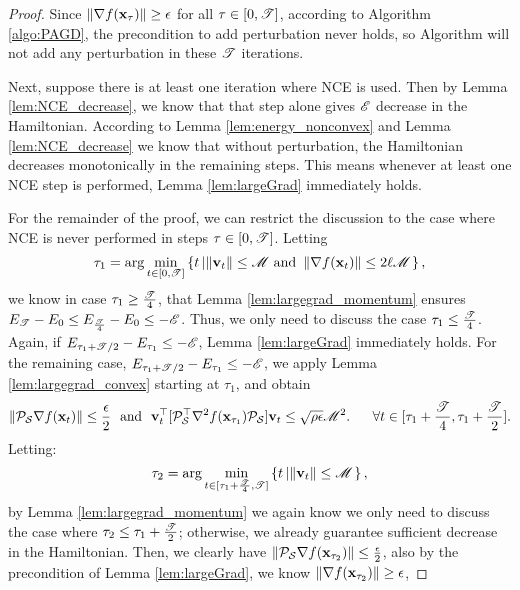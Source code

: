 \begin{proof}
Since $\left\|{\nabla f(\mathbf{x}_\tau)}\right\| \ge \epsilon$ for all $ \tau \in [0, \mathscr{T}]$, according to Algorithm \ref{algo:PAGD}, the precondition to add perturbation never holds, so Algorithm will not add any perturbation in these $\mathscr{T}$ iterations.

Next, suppose there is at least one iteration where NCE is used. Then by Lemma \ref{lem:NCE_decrease}, we know that that step alone gives $\mathscr{E}$ decrease in the Hamiltonian. According to Lemma \ref{lem:energy_nonconvex} and Lemma \ref{lem:NCE_decrease} we know that without perturbation, the Hamiltonian decreases monotonically in the remaining steps. This means whenever at least one NCE step is performed, Lemma \ref{lem:largeGrad} immediately holds.

For the remainder of the proof, we can restrict the discussion to the case where NCE is never performed in steps $\tau \in [0, \mathscr{T}]$.
Letting
\begin{equation*}
\tau_1 = \arg\min_{t \in [0, \mathscr{T}]}\left\{t \left| \left\|{\mathbf{v}_t}\right\|\le \mathscr{M}
\text{~and~} \left\|{\nabla f(\mathbf{x}_t)}\right\| \le 2\ell\mathscr{M} \right.\right\},
\end{equation*}
we know in case $\tau_1 \ge \frac{\mathscr{T}}{4}$, that Lemma \ref{lem:largegrad_momentum} 
ensures 
$E_{\mathscr{T}} - E_0 \le E_{\frac{\mathscr{T}}{4}} - E_0 \le -\mathscr{E}$.
Thus, we only need to discuss the case $\tau_1 \le \frac{\mathscr{T}}{4}$.
Again, if $E_{\tau_1 + \mathscr{T}/2} - E_{\tau_1}\le -\mathscr{E}$, Lemma \ref{lem:largeGrad} immediately holds. For the remaining case, $E_{\tau_1 + \mathscr{T}/2} - E_{\tau_1}\le -\mathscr{E}$, we apply Lemma \ref{lem:largegrad_convex} starting at $\tau_1$, and obtain
    \begin{equation*}
    \left\|{\mathcal{P}_{\mathcal{S}}\nabla f(\mathbf{x}_{t})}\right\| \le \frac{\epsilon}{2}
    \text{~~and~~}
    \mathbf{v}_t^{\top} [\mathcal{P}_{\mathcal{S}}^{\top} \nabla^2 f(\mathbf{x}_{\tau_1}) \mathcal{P}_{\mathcal{S}}] \mathbf{v}_t \le \sqrt{\rho\epsilon}\mathscr{M}^2.
    ~~\quad \forall t \in [\tau_1 + \frac{\mathscr{T}}{4}, \tau_1 + \frac{\mathscr{T}}{2}].
    \end{equation*}
Letting:
\begin{equation*}
\tau_2 = \arg\min_{t \in [\tau_1 + \frac{\mathscr{T}}{4}, \mathscr{T}]}\left\{t \left| \left\|{\mathbf{v}_t}\right\|\le \mathscr{M} \right.\right\},
\end{equation*}
by Lemma \ref{lem:largegrad_momentum} we again know we only need to discuss the case where $\tau_2 \le \tau_1 + \frac{\mathscr{T}}{2}$; otherwise, we already guarantee sufficient decrease in the Hamiltonian.
Then, we clearly have $\left\|{\mathcal{P}_{\mathcal{S}}\nabla f(\mathbf{x}_{\tau_2})}\right\| \le \frac{\epsilon}{2}$, also by the precondition of Lemma \ref{lem:largeGrad}, we know $\left\|{\nabla f(\mathbf{x}_{\tau_2})}\right\| \ge \epsilon$, 

\end{proof}
